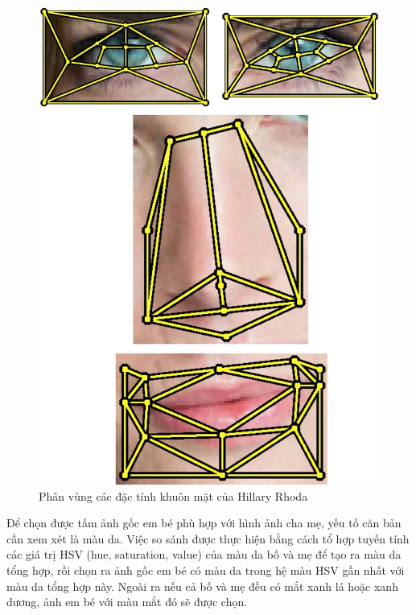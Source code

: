 \documentclass[conference]{IEEEtran}
\begin{document}
\begin{figure}[!t]
\centering
\includegraphics{Images/17}
\caption{Phân vùng các đặc tính khuôn mặt của Hillary Rhoda}
\label{refhinh9}
\end{figure}

Để chọn được tấm ảnh gốc em bé phù hợp với hình ảnh cha mẹ, yếu tố căn bản cần xem xét là màu da. Việc so sánh được thực hiện bằng cách tổ hợp tuyến tính các giá trị HSV (hue, saturation, value) của màu da bố và mẹ để tạo ra màu da tổng hợp, rồi chọn ra ảnh gốc em bé có màu da trong hệ màu HSV gần nhất với màu da tổng hợp này. Ngoài ra nếu cả bố và mẹ đều có mắt xanh lá hoặc xanh dương, ảnh em bé với màu mắt đó sẽ được chọn.
\end{document}
